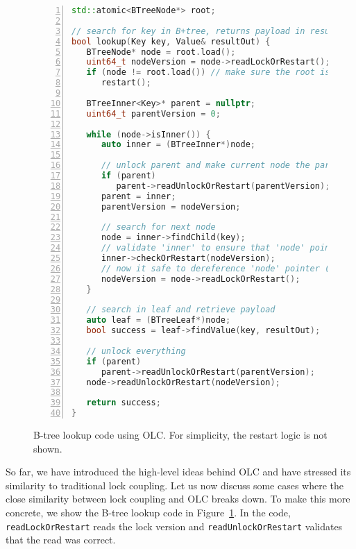 \documentclass[11pt]{article}
\begin{document}
\begin{figure}
\begin{lstlisting}[basicstyle=\ttfamily,language=C++,numbers=left,numberstyle=\small]
std::atomic<BTreeNode*> root;

// search for key in B+tree, returns payload in resultOut
bool lookup(Key key, Value& resultOut) {
   BTreeNode* node = root.load();
   uint64_t nodeVersion = node->readLockOrRestart();
   if (node != root.load()) // make sure the root is still the root
      restart();

   BTreeInner<Key>* parent = nullptr;
   uint64_t parentVersion = 0;

   while (node->isInner()) {
      auto inner = (BTreeInner*)node;

      // unlock parent and make current node the parent
      if (parent)
         parent->readUnlockOrRestart(parentVersion);
      parent = inner;
      parentVersion = nodeVersion;

      // search for next node
      node = inner->findChild(key);
      // validate 'inner' to ensure that 'node' pointer is valid
      inner->checkOrRestart(nodeVersion);
      // now it safe to dereference 'node' pointer (read its version)
      nodeVersion = node->readLockOrRestart();
   }

   // search in leaf and retrieve payload
   auto leaf = (BTreeLeaf*)node;
   bool success = leaf->findValue(key, resultOut);

   // unlock everything
   if (parent)
      parent->readUnlockOrRestart(parentVersion);
   node->readUnlockOrRestart(nodeVersion);

   return success;
}
\end{lstlisting}
  \vspace{0.2cm}
  \caption{B-tree lookup code using OLC. For simplicity, the restart logic is not shown.}
  \label{fig:lookup}
\end{figure}

So far, we have introduced the high-level ideas behind OLC and have stressed its similarity to traditional lock coupling.
Let us now discuss some cases where the close similarity between lock coupling and OLC breaks down.
To make this more concrete, we show the B-tree lookup code in Figure~\ref{fig:lookup}.
In the code, \texttt{readLockOrRestart} reads the lock version and \texttt{readUnlockOrRestart} validates that the read was correct.
\end{document}
